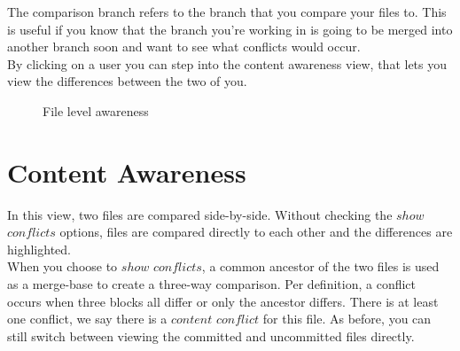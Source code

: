 The comparison branch refers to the branch that you compare your files to. This is useful if you know that the branch you're working in is going to be merged into another branch soon and want to see what conflicts would occur. \\

By clicking on a user you can step into the content awareness view, that lets you view the differences between the two of you.



\begin{figure}[h!]
  \centering
  \caption{File level awareness}
  \label{fig:filelevel}
\end{figure}



\section{Content Awareness}

In this view, two files are compared side-by-side. Without checking the $show$ $conflicts$ options, files are compared directly to each other and the differences are highlighted. \\

When you choose to $show$ $conflicts$, a common ancestor of the two files is used as a merge-base to create a three-way comparison. Per definition, a conflict occurs when three blocks all differ or only the ancestor differs. There is at least one conflict, we say there is a $content$ $conflict$ for this file. As before, you can still switch between viewing the committed and uncommitted files directly.



